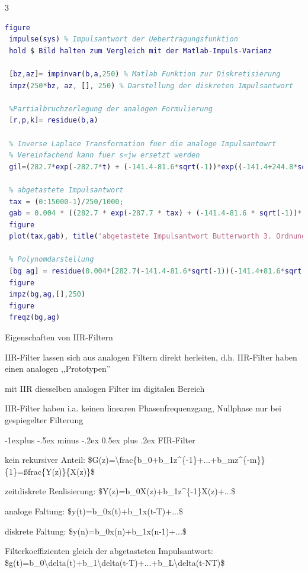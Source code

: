 \documentclass[a4paper]{article}
\makeatletter
\renewcommand{\subsection}{\@startsection{subsection}{2}{0mm}%
 {-1explus -.5ex minus -.2ex}%
 {0.5ex plus .2ex}%
 {\normalfont\normalsize\bfseries}}
\makeatother
\begin{document}
\begin{multicols}{3}
\begin{lstlisting}[language=matlab]
 figure
 impulse(sys) % Impulsantwort der Uebertragungsfunktion
 hold $ Bild halten zum Vergleich mit der Matlab-Impuls-Varianz
 
 [bz,az]= impinvar(b,a,250) % Matlab Funktion zur Diskretisierung
 impz(250*bz, az, [], 250) % Darstellung der diskreten Impulsantwort
 
 %Partialbruchzerlegung der analogen Formulierung
 [r,p,k]= residue(b,a)
 
 % Inverse Laplace Transformation fuer die analoge Impulsantowrt
 % Vereinfachend kann fuer s=jw ersetzt werden
 gil=(282.7*exp(-282.7*t) + (-141.4-81.6*sqrt(-1))*exp((-141.4+244.8*sqrt(-1))*t) + (-141.4+81.6*sqrt(-1))*exp((-141.4-244.8*sqrt(-1))*t))
 
 % abgetastete Impulsantwort
 tax = (0:15000-1)/250/1000;
 gab = 0.004 * ((282.7 * exp(-287.7 * tax) + (-141.4-81.6 * sqrt(-1))* exp((-141.4+244.8*sqrt(-1))*tax) + (-141.4+81.6*sqrt(-1))* exp((-141.4-244.8*sqrt(-1))*tax)));
 figure
 plot(tax,gab), title('abgetastete Impulsantwort Butterworth 3. Ordnung')
 
 % Polynomdarstellung
 [bg ag] = residue(0.004*[282.7(-141.4-81.6*sqrt(-1))(-141.4+81.6*sqrt(-1))], [exp(-282.7/250) exp((-141.4+244.8*sqrt(-1))/250) exp((-141.4 -244.8 *sqrt(-1))/250)], [0])
 figure
 impz(bg,ag,[],250)
 figure
 freqz(bg,ag) 
 \end{lstlisting}

  Eigenschaften von IIR-Filtern

  \begin{itemize*}
    \item IIR-Filter lassen sich aus analogen Filtern direkt herleiten, d.h. IIR-Filter haben einen analogen ,,Prototypen''
    \item mit IIR diesselben analogen Filter im digitalen Bereich
    \item IIR-Filter haben i.a. keinen linearen Phasenfrequenzgang, Nullphase nur bei gespiegelter Filterung
  \end{itemize*}

  \subsection{FIR-Filter}\label{fir-filter}

  \begin{itemize*}
    \item kein rekursiver Anteil: \$G(z)=\textbackslash frac\{b\_0+b\_1z\^{}\{-1\}+...+b\_mz\^{}\{-m\}\}\{1\}=ßfrac\{Y(z)\}\{X(z)\}\$
    \item zeitdiskrete Realisierung: \$Y(z)=b\_0X(z)+b\_1z\^{}\{-1\}X(z)+...\$
    \item analoge Faltung: \$y(t)=b\_0x(t)+b\_1x(t-T)+...\$
    \item diskrete Faltung: \$y(n)=b\_0x(n)+b\_1x(n-1)+...\$
    \item Filterkoeffizienten gleich der abgetasteten Impulsantwort: \$g(t)=b\_0\textbackslash delta(t)+b\_1\textbackslash delta(t-T)+...+b\_L\textbackslash delta(t-NT)\$
  \end{itemize*}


\end{multicols}
\end{document}
